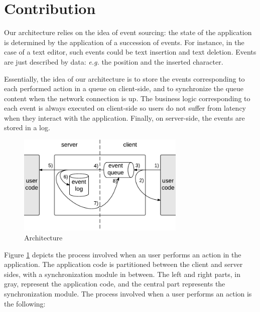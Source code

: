 \documentclass{llncs}
\begin{document}
\section{Contribution}

Our architecture relies on the idea of event sourcing: the state of the application is determined by the application of a succession of events. For instance, in the case of a text editor, such events could be text insertion and text deletion. Events are just described by data: \emph{e.g.} the position and the inserted character.

Essentially, the idea of our architecture is to store the events corresponding to each performed action in a queue on client-side, and to synchronize the queue content when the network connection is up. The business logic corresponding to each event is always executed on client-side so users do not suffer from latency when they interact with the application. Finally, on server-side, the events are stored in a log.

\begin{figure}
\centering
\includegraphics[width=8cm]{arch.pdf}
\caption{Architecture}
\label{fig-arch}
\end{figure}

Figure \ref{fig-arch} depicts the process involved when an user performs an action in the application. The application code is partitioned between the client and server sides, with a synchronization module in between. The left and right parts, in gray, represent the application code, and the central part represents the synchronization module. The process involved when a user performs an action is the following:
\end{document}

